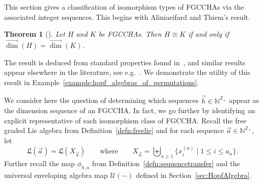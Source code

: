 \documentclass[11pt]{amsart}
\newtheorem{theorem}{Theorem}[section]
\theoremstyle{definition}
\numberwithin{equation}{section}
\def\NN{{\mathbb N}}
\def\ZZ{{\mathbb Z}}
\newcommand{\FGCCHA}{\textsf{FGCCHA}\xspace}
\newcommand{\FGCCHAs}{\textsf{FGCCHA}s\xspace}
\newcommand{\vecdim}{\overrightarrow{\dim}}
\newcommand{\lucas}[1]{\todo[size=\tiny,color=red!50]{#1 \\ \hfill --- Lucas}}
\begin{document}
This section gives a classification of isomorphism types of \FGCCHAs via the associated integer sequences.  
This begins with Aliniaeifard and Thiem's result.

\begin{theorem}[{\cite[Theorem 12]{AT22}}]
\label{thm:AT}
Let $H$ and $K$ be \FGCCHAs.  Then $H \cong K$ if and only if $\vecdim(H) = \vecdim(K)$.
\end{theorem}

The result is deduced from standard properties found in~\cite[Section 4.1]{L08}, and similar results appear elsewhere in the literature, see e.g.~\cite[Prop.~1.4]{AS05cc}.  We demonstrate the utility of this result in Example~\ref{example:hopf_algebras_of_permutations}.


We consider here the question of determining which sequences $\vec{h} \in \NN^{\ZZ_+}$
appear as the dimension sequence of an \FGCCHA.  In fact,
we go further by identifying an explicit representative of each isomorphism class of \FGCCHA.  
Recall the free graded Lie algebra from Definition~\ref{defn:freelie} and for each sequence $\vec{a} \in \NN^{\ZZ_{+}}$, let
\begin{equation}
\label{eq:La}
\mathfrak{L}(\vec{a}) = \mathfrak{L}(X_{\vec{a}}) \qquad\text{where}\qquad X_{\vec{a}} = \biguplus_{n \ge 1} \{x^{(n)}_{i} \;|\; 1 \le i \le a_{n}\}.
\end{equation}
Further recall the map $\phi_{h, a}$ from
Definition~\ref{defn:sequencetransfer} and the universal enveloping
algebra map $\mathcal{U}(-)$ defined in Section~\ref{sec:HopfAlgebra}.
\end{document}
